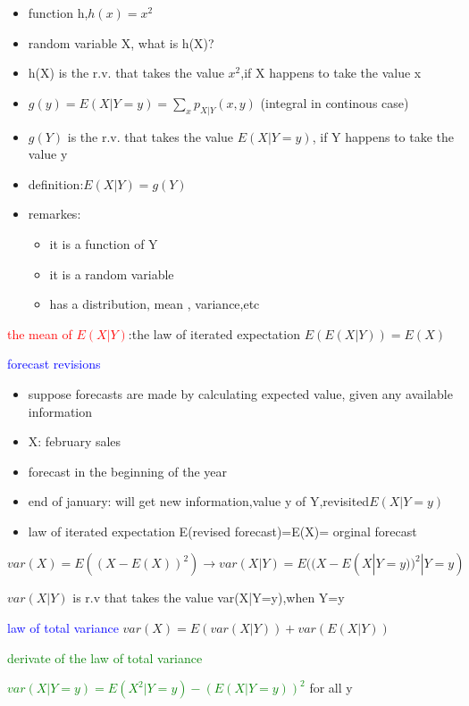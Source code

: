 \begin{itemize}
    \item function h,$h(x)=x^2$
    \item random variable X, what is h(X)?
    \item h(X) is the r.v. that takes the value $x^2$,if X happens to take the value x
    \item $g(y)=E(X|Y=y)=\sum_xp_{X|Y}(x,y)$ (integral in continous case)
    \item $g(Y)$ is the r.v. that takes the value $E(X|Y=y)$, if Y happens to take the value y
    \item definition:$E(X|Y)=g(Y)$
    \item remarkes:
    \begin{itemize}
        \item it is a function of Y
        \item it is a random variable
        \item has a distribution, mean , variance,etc
    \end{itemize}
\end{itemize}



\textcolor{red}{the mean of $E(X|Y)$}:the law of iterated expectation
$E(E(X|Y))=E(X)$


\textcolor{blue}{forecast revisions}

\begin{itemize}
    \item suppose forecasts are made by calculating expected value, given any available information
    \item X: february sales
    \item forecast in the beginning of the year
    \item end of january: will get new information,value y of Y,revisited$E(X|Y=y)$
    \item law of iterated expectation E(revised forecast)=E(X)= orginal forecast
\end{itemize}


$var(X)=E((X-E(X))^2)\to var(X|Y)=E((X-E(X|Y=y))^2|Y=y)$

$var(X|Y)$ is r.v that takes the value var(X|Y=y),when Y=y 

\textcolor{blue}{law of total variance}
$var(X)=E(var(X|Y))+var(E(X|Y))$


\textcolor{green}{derivate of the law of total variance}

\textcolor{green}{$var(X|Y=y)=E(X^2|Y=y)-(E(X|Y=y))^2$} for all y 

